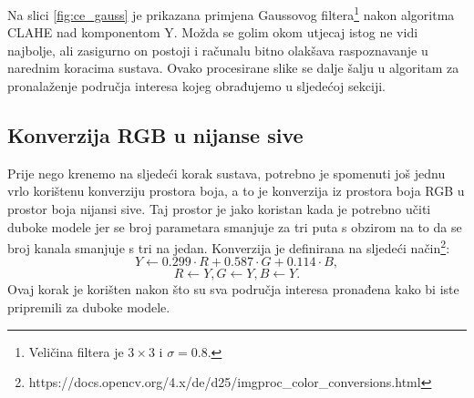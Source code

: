 \documentclass[times, utf8, diplomski]{fer}
\begin{document}
Na slici \ref{fig:ce_gauss} je prikazana primjena Gaussovog filtera\footnote{Veličina filtera je $3 \times 3$ i $\sigma=0.8$.} nakon algoritma CLAHE nad komponentom Y. Možda se golim okom utjecaj istog ne vidi najbolje, ali zasigurno on postoji i računalu bitno olakšava raspoznavanje u narednim koracima sustava. Ovako procesirane slike se dalje šalju u algoritam za pronalaženje područja interesa kojeg obrađujemo u sljedećoj sekciji.

\subsection{Konverzija RGB u nijanse sive}
Prije nego krenemo na sljedeći korak sustava, potrebno je spomenuti još jednu vrlo korištenu konverziju prostora boja, a to je konverzija iz prostora boja RGB u prostor boja nijansi sive. Taj prostor je jako koristan kada je potrebno učiti duboke modele jer se broj parametara smanjuje za tri puta s obzirom na to da se broj kanala smanjuje s tri na jedan. Konverzija je definirana na sljedeći način\footnote{https://docs.opencv.org/4.x/de/d25/imgproc\_color\_conversions.html}:
\begin{equation}
    Y \leftarrow 0.299 \cdot R + 0.587 \cdot G + 0.114 \cdot B,
\end{equation}
\begin{equation}
    R \leftarrow Y, G \leftarrow Y, B \leftarrow Y.
\end{equation}
Ovaj korak je korišten nakon što su sva područja interesa pronađena kako bi iste pripremili za duboke modele.
\end{document}
